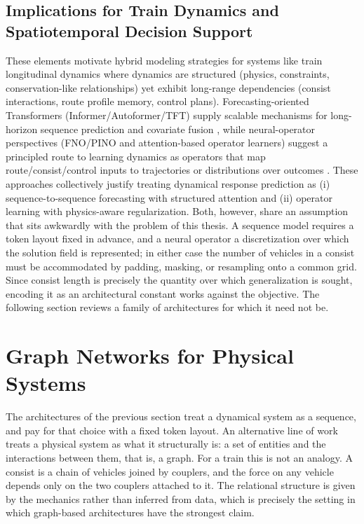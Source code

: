 \subsection{Implications for Train Dynamics and Spatiotemporal Decision Support}

These elements motivate hybrid modeling strategies for systems like train longitudinal dynamics where dynamics are structured (physics, constraints, conservation-like relationships) yet exhibit long-range dependencies (consist interactions, route profile memory, control plans). Forecasting-oriented Transformers (Informer/Autoformer/TFT) supply scalable mechanisms for long-horizon sequence prediction and covariate fusion \cite{zhou2020informer,wu2021autoformer,lim2019tft}, while neural-operator perspectives (FNO/PINO and attention-based operator learners) suggest a principled route to learning dynamics as operators that map route/consist/control inputs to trajectories or distributions over outcomes \cite{li2021fno,li2021pino,cao2021choose,li2023transformerpde}. These approaches collectively justify treating dynamical response prediction as (i) sequence-to-sequence forecasting with structured attention and (ii) operator learning with physics-aware regularization. Both, however, share an assumption that sits awkwardly with the problem of this thesis. A sequence model requires a token layout fixed in advance, and a neural operator a discretization over which the solution field is represented; in either case the number of vehicles in a consist must be accommodated by padding, masking, or resampling onto a common grid. Since consist length is precisely the quantity over which generalization is sought, encoding it as an architectural constant works against the objective. The following section reviews a family of architectures for which it need not be.

\section{Graph Networks for Physical Systems}
\label{sec:graph_networks}

The architectures of the previous section treat a dynamical system as a sequence, and pay for that choice with a fixed token layout. An alternative line of work treats a physical system as what it structurally is: a set of entities and the interactions between them, that is, a graph. For a train this is not an analogy. A consist is a chain of vehicles joined by couplers, and the force on any vehicle depends only on the two couplers attached to it. The relational structure is given by the mechanics rather than inferred from data, which is precisely the setting in which graph-based architectures have the strongest claim.

